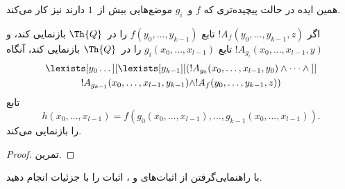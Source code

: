 \documentclass[../../../include/open-logic-section]{subfiles}
\begin{document}
همین ایده در حالت پیچیده‌تری که $f$ و~$g_i$ موضع‌هایی بیش از~$1$
دارند نیز کار می‌کند.

\begin{prop}
اگر $!A_f(y_0, \dots, y_{k-1}, z)$ تابع $f(y_0, \dots, y_{k-1})$ را
در~$\Th{Q}$ بازنمایی کند، و $!A_{g_i}(x_0, \dots, x_{l-1}, y)$ تابع
$g_i(x_0, \dots, x_{l-1})$ را در~$\Th{Q}$ بازنمایی کند، آنگاه
\begin{multline*}
  \lexists[y_0\dots][\lexists[y_{k-1}][(!A_{g_0}(x_0,\dots,x_{l-1},y_0) \land
      \dots \land {}]]\\
  !A_{g_{k-1}}(x_0,\dots,x_{l-1},y_{k-1}) \land !A_f(y_0,\dots,y_{k-1},z))
\end{multline*}
تابع
\[
h(x_0, \dots, x_{l-1}) = f(g_0(x_0, \dots, x_{l-1}), \dots, g_{k-1}(x_0,
\dots, x_{l-1})).
\]
را بازنمایی می‌کند.
\end{prop}

\begin{proof}
تمرین.
\end{proof}

\begin{prob}
با راهنمایی‌گرفتن از اثبات‌های  و
، اثبات
 را با جزئیات انجام دهید.
\end{prob}
\end{document}

